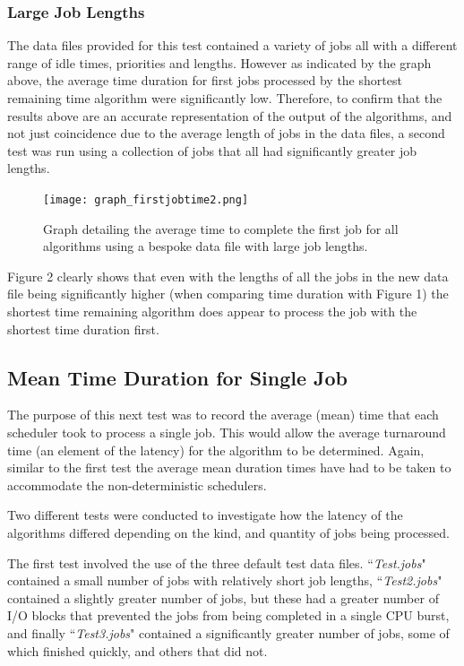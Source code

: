 \documentclass{acm_proc_article-sp}
\begin{document}
\subsubsection{Large Job Lengths}
The data files provided for this test contained a variety of jobs all with a different range of idle times, priorities and lengths. However as indicated by the graph above, the average time duration for first jobs processed by the shortest remaining time algorithm were significantly low. Therefore, to confirm that the results above are an accurate representation of the output of the algorithms, and not just coincidence due to the average length of jobs in the data files, a second test was run using a collection of jobs that all had significantly greater job lengths.

\begin{figure}[!htbp]
\centering
\texttt{[image: graph\_firstjobtime2.png]}
\caption{Graph detailing the average time to complete the first job for all algorithms using a bespoke data file with large job lengths.}
\end{figure}

Figure 2 clearly shows that even with the lengths of all the jobs in the new data file being significantly higher (when comparing time duration with Figure 1) the shortest time remaining algorithm does appear to process the job with the shortest time duration first. 

\subsection{Mean Time Duration for Single Job}

The purpose of this next test was to record the average (mean) time that each scheduler took to process a single job. This would allow the average turnaround time (an element of the latency) for the algorithm to be determined. Again, similar to the first test the average mean duration times have had to be taken to accommodate the non-deterministic schedulers. 

Two different tests were conducted to investigate how the latency of the algorithms differed depending on the kind, and quantity of jobs being processed. 

The first test involved the use of the three default test data files. ``\textit{Test.jobs}" contained a small number of jobs with relatively short job lengths, ``\textit{Test2.jobs}" contained a slightly greater number of jobs, but these had a greater number of I/O blocks that prevented the jobs from being completed in a single CPU burst, and finally ``\textit{Test3.jobs}" contained a significantly greater number of jobs, some of which finished quickly, and others that did not.  
\end{document}
